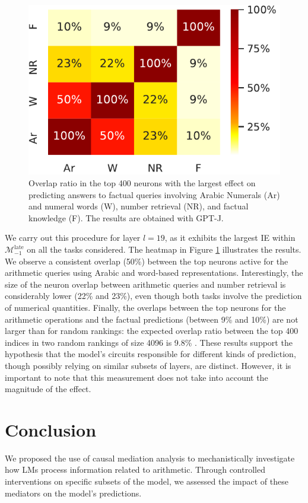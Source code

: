 \documentclass[11pt]{article}
\begin{document}
\begin{figure}[t]
    \centering
    \includegraphics[width=0.8\columnwidth]{img/neuron_overlap.pdf}
    \vspace{-1mm}
    \caption{Overlap ratio in the top 400 neurons with the largest effect on predicting answers to factual queries involving Arabic Numerals (Ar) and numeral words (W), number retrieval (NR), and factual knowledge (F). The results are obtained with GPT-J.}
    \label{fig:neurons}
\end{figure}
We carry out this procedure for layer $l=19$, as it exhibits the largest IE within $\mathcal{M}_{-1}^{\text{late}}$ on all the tasks considered. The heatmap in Figure \ref{fig:neurons} illustrates the results. 
We observe a consistent overlap (50\%) between the top neurons active for the arithmetic queries using Arabic and word-based representations. 
Interestingly,  the size of the neuron overlap between arithmetic queries and number retrieval is considerably lower (22\% and 23\%), even though both tasks involve the prediction of numerical quantities.
Finally, the  overlaps between the top neurons for the arithmetic operations and the factual predictions (between 9\% and 10\%) are not larger than for random rankings: the expected overlap ratio between the top 400 indices in two random rankings of size 4096 is 9.8\% \cite{antverg2022on}.
These results support the hypothesis that the model's circuits responsible for different kinds of prediction, though possibly relying on similar subsets of layers, are distinct. However, it is important to note that this measurement does not take into account the magnitude of the effect.


\section{Conclusion}
We proposed the use of causal mediation analysis to mechanistically investigate how LMs process information related to arithmetic.
Through controlled interventions on specific subsets of the model, we assessed the impact of these mediators on the model's predictions.
\end{document}
